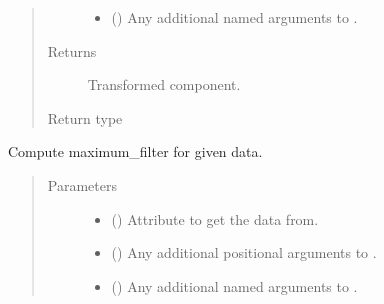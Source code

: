 \documentclass[letterpaper,10pt,english]{sphinxmanual}
\begin{document}
\begin{fulllineitems}
\begin{fulllineitems}
\begin{quote}
\begin{description}
\begin{itemize}
\item {} 
 () \textendash{} Any additional named arguments to .

\end{itemize}

\item[{Returns}] \leavevmode
{} \textendash{} Transformed component.

\item[{Return type}] \leavevmode
{\hyperref[\detokenize{api/base_classes:geology.src.base_spatial.SpatialComponent}]{}}

\end{description}\end{quote}

\end{fulllineitems}


\begin{fulllineitems}
\label{\detokenize{api/rock:geology.src.Rock.maximum_filter}}
Compute maximum\_filter for given data.
\begin{quote}\begin{description}
\item[{Parameters}] \leavevmode\begin{itemize}
\item {} 
 (\sphinxstyleliteralemphasis{\sphinxupquote{, }}) \textendash{} Attribute to get the data from.

\item {} 
 () \textendash{} Any additional positional arguments to .

\item {} 
 () \textendash{} Any additional named arguments to .


\end{itemize}
\end{description}
\end{quote}
\end{fulllineitems}
\end{fulllineitems}
\end{document}

